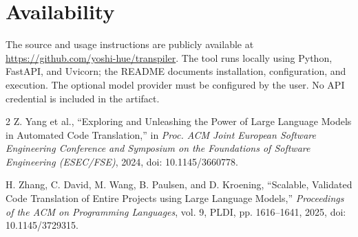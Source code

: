 \documentclass[10pt,conference]{IEEEtran}
\begin{document}
\section{Availability}
The source and usage instructions are publicly available at
\url{https://github.com/yoshi-hue/transpiler}. The tool runs locally using Python,
FastAPI, and Uvicorn; the README documents installation, configuration, and execution.
The optional model provider must be configured by the user. No API credential is
included in the artifact.

\begin{thebibliography}{2}
Z. Yang et al., ``Exploring and Unleashing the Power of Large Language Models in
Automated Code Translation,'' in \emph{Proc. ACM Joint European Software Engineering
Conference and Symposium on the Foundations of Software Engineering (ESEC/FSE)}, 2024,
doi: 10.1145/3660778.

H. Zhang, C. David, M. Wang, B. Paulsen, and D. Kroening, ``Scalable, Validated Code
Translation of Entire Projects using Large Language Models,'' \emph{Proceedings of the
ACM on Programming Languages}, vol. 9, PLDI, pp. 1616--1641, 2025,
doi: 10.1145/3729315.
\end{thebibliography}
\end{document}
